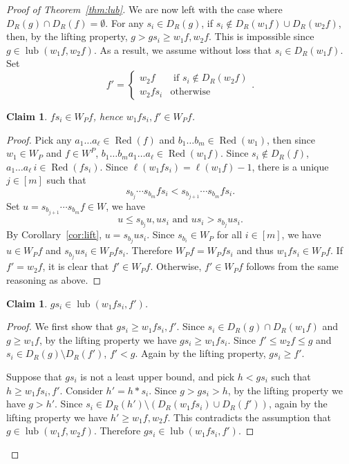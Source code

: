 \documentclass[12pt,reqno]{amsart}
\newtheorem{claim}[lemma]{Claim}
\theoremstyle{definition}
\newcommand{\lub}{\operatorname{lub}}
\newcommand{\Red}{\operatorname{Red}}
\begin{document}
{\begin{proof}[Proof of Theorem~\ref{thm:lub}]
    We are now left with the case where $D_{R}(g) \cap D_{R}(f) = \emptyset$. For any $s_i\in D_{R}(g)$, if $s_i\notin D_{R}(w_1f)\cup D_{R}(w_2f)$, then, by the lifting property, $g>gs_i\geq w_1f,w_2f$. This is impossible since $g\in \lub(w_1f,w_2f)$. As a result, we assume without loss that $s_i\in D_{R}(w_1f)$. Set
    \[f' = \begin{cases}
        w_2f & \text{ if }s_i\notin D_{R}(w_2f)\\
        w_2fs_i & \text{otherwise}
    \end{cases}.\]
    \begin{claim}\label{claim:fsi}
        $fs_i\in W_P f$, hence $w_1fs_i,f'\in W_Pf$.
    \end{claim}
    \begin{proof}
        Pick any $a_1\dots a_{\ell}\in \Red(f)$ and $b_1\dots b_m\in \Red(w_1)$, then since $w_1\in W_P$ and $f\in W^P$, $b_1\dots b_m a_1\dots a_\ell \in \Red(w_1f)$. Since $s_i\notin D_{R}(f)$, $a_1\dots a_\ell\,  i \in \Red(fs_i)$. Since $\ell(w_1fs_i) = \ell(w_1f) - 1$, there is a unique $j\in [m]$ such that 
        \[s_{b_j}\cdots s_{b_m}fs_i< s_{b_{j+1}} \cdots s_{b_m}fs_i.\]
        Set $u = s_{b_{j+1}} \cdots s_{b_m}f\in W$, we have 
        \[u\leq s_{b_j}u, us_i\text{ and }us_i>s_{b_j}us_i.\]
        By Corollary~\ref{cor:lift}, $u = s_{b_j}us_{i}$. Since $s_{b_i}\in W_P$ for all $i\in [m]$, we have $u\in W_P f$ and $s_{b_j}us_i\in W_P fs_i$. 
        Therefore $W_Pf=W_Pfs_i$ and thus 
        $w_1fs_i\in W_P f$.
        If $f' = w_2f$, it is clear that $f'\in W_Pf$. Otherwise, $f'\in W_Pf$ follows from the same reasoning as above.
    \end{proof}
    
    \begin{claim}\label{claim:gsi}
         $gs_i\in \lub(w_1fs_i,f')$. 
    \end{claim}
    \begin{proof}
        We first show that $gs_i\geq w_1fs_i,f'$. Since $s_i\in D_{R}(g)\cap D_{R}(w_1f)$ and $g\geq w_1f$, by the lifting property we have $gs_i\geq w_1fs_i$. Since $f'\leq w_2f\leq g$ and $s_i\in D_{R}(g)\setminus D_{R}(f')$, $f'<g$.
        Again by the lifting property, $gs_i\geq f'$.
        

        Suppose that $gs_i$ is not a least upper bound, and pick $h<gs_i$ such that $h\geq w_1fs_i,f'$. Consider $h' = h\ast s_i$. Since $g>gs_i>h$, by the lifting property we have $g>h'$. Since $s_i\in D_{R}(h')\setminus (D_{R}(w_1fs_i)\cup D_{R}(f'))$, again by the lifting property we have $h'\geq w_1f,w_2f$. This contradicts the assumption that $g\in \lub(w_1f,w_2f)$. Therefore $gs_i\in \lub(w_1fs_i,f')$. 
    \end{proof}
    

\end{proof}}
\end{document}
